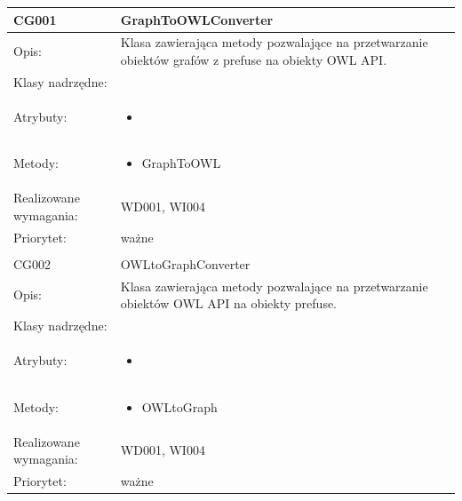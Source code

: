 \documentclass[a4paper,10pt]{article}
\begin{document}
\begin{center}
 


\begin{longtable}{|m{3cm}|m{9cm}|} \hline

CG001 & GraphToOWLConverter \\ \hline
Opis: & Klasa zawierająca metody pozwalające na przetwarzanie obiektów grafów z prefuse na obiekty OWL API. \\ \hline
Klasy nadrzędne: &     \\ \hline
Atrybuty: & \begin{itemize}
 \item 
\end{itemize}
 \\ \hline
Metody: & \begin{itemize}
 \item GraphToOWL
\end{itemize}
  \\ \hline
Realizowane wymagania: & WD001, WI004 \\ \hline
Priorytet: & ważne  \\ \hline

\multicolumn{2}{c}{} \\
 \hline

CG002 & OWLtoGraphConverter \\ \hline
Opis: & Klasa zawierająca metody pozwalające na przetwarzanie obiektów OWL API na obiekty prefuse. \\ \hline
Klasy nadrzędne: &     \\ \hline
Atrybuty: & \begin{itemize}
 \item 
\end{itemize}
 \\ \hline
Metody: & \begin{itemize}
 \item OWLtoGraph
\end{itemize}
  \\ \hline
Realizowane wymagania: & WD001, WI004 \\ \hline
Priorytet: & ważne  \\ \hline



\end{longtable}

\end{center}


\clearpage
{}
{}

\end{document}
